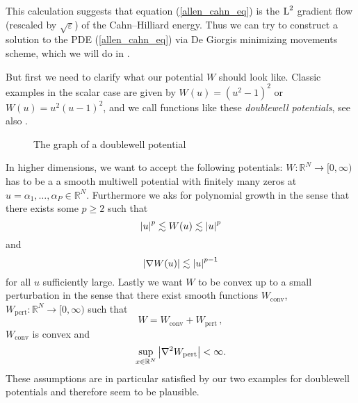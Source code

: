 This calculation suggests that equation (\ref{allen_cahn_eq}) is the $ \operatorname{L}^{ 2 } $ gradient flow (rescaled by $ \sqrt{\varepsilon} $) of the Cahn--Hilliard energy. Thus we can try to construct a solution to the PDE (\ref{allen_cahn_eq}) via De Giorgis minimizing movements scheme, which we will do in .

But first we need to clarify what our potential $ W $ should look like. Classic examples in the scalar case are given by $ W ( u ) = \left( u^{ 2 } - 1 \right)^{ 2 } $ or $ W( u ) = u^{ 2 } ( u - 1 )^{ 2 } $, and we call functions like these \emph{doublewell potentials}, see also .

\begin{figure}[ht]
\centering
{}
\caption{The graph of a doublewell potential}
\label{graph_of_doublewell_potential}
\end{figure}

In higher dimensions, we want to accept the following potentials: $ W \colon \mathbb{ R }^{ N } \to [0, \infty ) $ has to be a a smooth multiwell potential with finitely many zeros at $ u = \alpha_{ 1 }, \dotsc , \alpha_{ P } \in \mathbb{ R }^{ N } $. Furthermore we aks for polynomial growth in the sense that there exists some $ p \geq 2 $ such that
\begin{equation}
	\label{polynomial_growth}
	\abs{ u }^{ p } \lesssim W(u) \lesssim \abs{ u }^{ p }
\end{equation}
and
\begin{equation}
	\label{polynomial_growth_derivative}
	\abs{ \nabla W ( u ) } \lesssim \abs{ u }^{ p -1 }
\end{equation}
for all $ u $ sufficiently large. Lastly we want $ W $ to be convex up to a small perturbation in the sense that there exist smooth functions 
$ W_{ \mathrm{conv} }$, $ W_{ \mathrm{pert} } \colon \mathbb{ R }^{ N } \to [ 0 , \infty ) $ such that
\begin{equation}
	\label{decomposition_of_w}
	W = W_{ \mathrm{conv}} + W_{ \mathrm{pert}}\, ,
\end{equation}
$ W_{ \mathrm{conv} } $ is convex and
\begin{equation}
	\label{perturbation bound}
	\sup_{ x \in \mathbb{ R }^{ N } }
	\abs{ \nabla^{ 2 } W_{ \mathrm{pert} } } < \infty.
\end{equation}
These assumptions are in particular satisfied by our two examples for doublewell potentials and therefore seem to be plausible.


